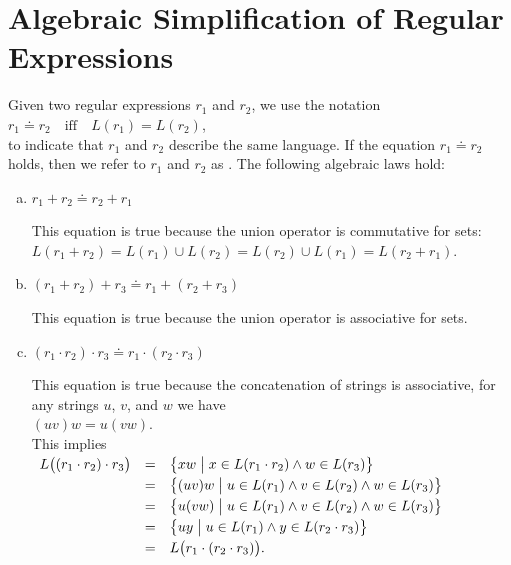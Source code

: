 \section{Algebraic Simplification of Regular Expressions}
Given two regular expressions $r_1$ and $r_2$, we use the notation
\\[0.2cm]
\hspace*{1.3cm}
$r_1 \doteq r_2 \quad \text{iff} \quad L(r_1) = L(r_2)$, \index{$\doteq$}
\\[0.2cm]
to indicate that $ r_1 $ and $ r_2 $ describe the same language. If the equation $ r_1 \doteq r_2 $
holds, then we refer to $ r_1 $ and $ r_2 $ as . The
following algebraic laws hold: 
\begin{enumerate}[(a)]
\item $r_1 + r_2 \doteq r_2 + r_1$

      This equation is true because the union operator is commutative for sets:
      \\[0.2cm]
      \hspace*{1.3cm}
      $L(r_1 + r_2) = L(r_1) \cup L(r_2) = L(r_2) \cup L(r_1) = L(r_2 + r_1)$.
\item $(r_1 + r_2) + r_3 \doteq r_1 + (r_2 + r_3)$

      This equation is true because the union operator is associative for sets.
\item $(r_1 \cdot r_2) \cdot r_3 \doteq r_1 \cdot (r_2 \cdot r_3)$

      This equation is true because the concatenation of strings is associative, for any strings
      $u$, $v$, and $w$ we have
      \\[0.2cm]
      \hspace*{1.3cm}
      $(u v) w = u (v w)$.
      \\[0.2cm]
      This implies
      \\[0.2cm]
      \hspace*{1.3cm}
      $
      \begin{array}[t]{lcl}
        L\bigl( (r_1 \cdot r_2) \cdot r_3\bigr) 
        & = & \bigl\{ x w \bigm| x \in L(r_1 \cdot r_2) \wedge w \in L(r_3)\bigr\} \\[0.1cm]
        & = & \bigl\{ (u v) w \bigm| u \in L(r_1) \wedge v \in L(r_2) \wedge w \in L(r_3)\bigr\} \\[0.1cm]
        & = & \bigl\{ u (v w) \bigm| u \in L(r_1) \wedge v \in L(r_2) \wedge w \in L(r_3)\bigr\} \\[0.1cm]
        & = & \bigl\{ u y \bigm| u \in L(r_1) \wedge y \in L(r_2 \cdot r_3)\bigr\} \\[0.1cm]
        & = & L\bigl( r_1 \cdot (r_2 \cdot r_3)\bigr).
      \end{array}
      $


\end{enumerate}
